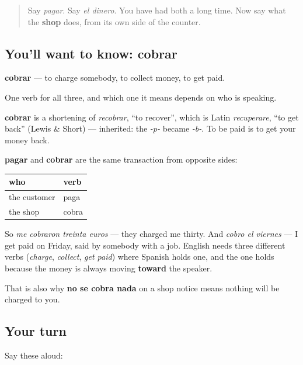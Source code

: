\begin{quote}
Say \emph{pagar}. Say \emph{el dinero}. You have had both a long time. Now say what the \textbf{shop} does, from its own side of the counter.
\end{quote}

\subsection*{You'll want to know: cobrar}
\textbf{cobrar} — to charge somebody, to collect money, to get paid.

One verb for all three, and which one it means depends on who is speaking.

\begin{cousinweb}
\textbf{cobrar} is a shortening of \emph{recobrar}, \textquotedblleft{}to recover\textquotedblright{}, which is Latin \emph{recuperare}, \textquotedblleft{}to get back\textquotedblright{} (Lewis \& Short) — inherited: the \emph{-p-} became \emph{-b-}. To be paid is to get your money back.
\end{cousinweb}

\begin{grammarlens}[title={Grammar Lens: who is on each end}]
\textbf{pagar} and \textbf{cobrar} are the same transaction from opposite sides:

\noindent
\begin{tabularx}{\linewidth}{@{}>{\raggedright\arraybackslash}X>{\raggedright\arraybackslash}X@{}}
\toprule
\textbf{who} & \textbf{verb} \\
\midrule
the customer & paga \\
the shop & cobra \\
\bottomrule
\end{tabularx}

So \emph{me cobraron treinta euros} — they charged me thirty. And \emph{cobro el viernes} — I get paid on Friday, said by somebody with a job. English needs three different verbs (\emph{charge}, \emph{collect}, \emph{get paid}) where Spanish holds one, and the one holds because the money is always moving \textbf{toward} the speaker.

That is also why \textbf{no se cobra nada} on a shop notice means nothing will be charged to you.
\end{grammarlens}

\subsection*{Your turn}
Say these aloud:


